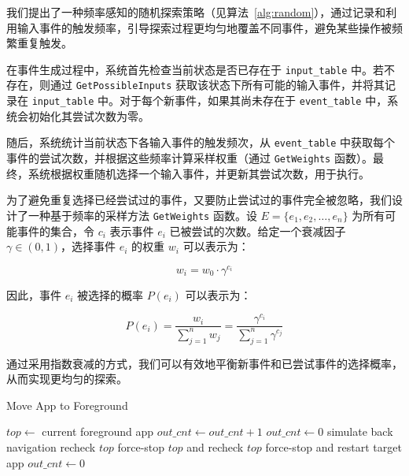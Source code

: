 \documentclass[twocolumn, 10pt]{article}
\begin{document}
我们提出了一种频率感知的随机探索策略（见算法~\ref{alg:random}），通过记录和利用输入事件的触发频率，引导探索过程更均匀地覆盖不同事件，避免某些操作被频繁重复触发。

在事件生成过程中，系统首先检查当前状态是否已存在于 \texttt{input\_table} 中。若不存在，则通过 \texttt{GetPossibleInputs} 获取该状态下所有可能的输入事件，并将其记录在 \texttt{input\_table} 中。对于每个新事件，如果其尚未存在于 \texttt{event\_table} 中，系统会初始化其尝试次数为零。

随后，系统统计当前状态下各输入事件的触发频次，从 \texttt{event\_table} 中获取每个事件的尝试次数，并根据这些频率计算采样权重（通过 \texttt{GetWeights} 函数）。最终，系统根据权重随机选择一个输入事件，并更新其尝试次数，用于执行。

为了避免重复选择已经尝试过的事件，又要防止尝试过的事件完全被忽略，我们设计了一种基于频率的采样方法 \texttt{GetWeights} 函数。设 $E = \{e_1, e_2, \dots, e_n\}$ 为所有可能事件的集合，令 $c_i$ 表示事件 $e_i$ 已被尝试的次数。给定一个衰减因子 $\gamma \in (0, 1)$，选择事件 $e_i$ 的权重 $w_i$ 可以表示为：

\begin{equation}
    w_i = w_0 \cdot \gamma^{c_i}
\end{equation}

因此，事件 $e_i$ 被选择的概率 $P(e_i)$ 可以表示为：

\begin{equation}
    P(e_i) = \frac{w_i}{\sum_{j=1}^{n} w_j} = \frac{\gamma^{c_i}}{\sum_{j=1}^{n} \gamma^{c_j}}
\end{equation}

通过采用指数衰减的方式，我们可以有效地平衡新事件和已尝试事件的选择概率，从而实现更均匀的探索。

\begin{algorithm}[t]
\caption{Move App to Foreground}
\label{alg:move-app}
\begin{algorithmic}[1]
    \State $top \gets$ current foreground app
        \State $out\_cnt \gets out\_cnt + 1$
            \State $out\_cnt \gets 0$
            \State simulate back navigation
            \State recheck $top$
                \State force-stop $top$ and recheck $top$
                    \State force-stop and restart target app
                \EndIf
            \EndIf
        \EndIf
    \Else
        \State $out\_cnt \gets 0$
    \EndIf
\EndFunction
\end{algorithmic}
\end{algorithm}
\end{document}
